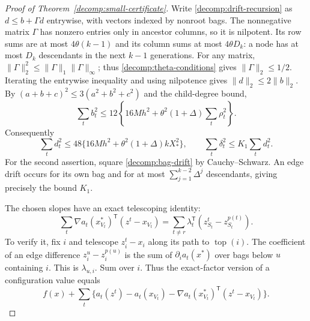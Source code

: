 \begin{proof}[Proof of Theorem~\ref{decomp:small-certificate}]
Write \eqref{decomp:drift-recursion} as $d\le b+\Gamma d$ entrywise, with
vectors indexed by nonroot bags.
The nonnegative matrix $\Gamma$ has nonzero entries only in ancestor
columns, so it is nilpotent. Its row sums are at most $4\theta(k-1)$ and its column
sums at most $4\theta D_k$: a node has at most $D_k$ descendants in the
next $k-1$ generations. For any matrix,
$\|\Gamma\|_2^2\le\|\Gamma\|_1\|\Gamma\|_\infty$; thus
\eqref{decomp:theta-conditions} gives $\|\Gamma\|_2\le1/2$.
Iterating the entrywise inequality and using nilpotence gives
$\|d\|_2\le2\|b\|_2$.
By $(a+b+c)^2\le3(a^2+b^2+c^2)$ and the child-degree bound,
\[
 \sum_tb_t^2\le12\left\{16Mh^2+
                \theta^2(1+\Delta)\sum_t\rho_t^2\right\}.
\]
Consequently
\begin{equation}\label{decomp:drift-squared}
 \sum_td_t^2\le48\{16Mh^2+
                       \theta^2(1+\Delta)kX_*^2\},
 \qquad
 \sum_t\delta_t^2\le K_1\sum_td_t^2.
\end{equation}
For the second assertion, square \eqref{decomp:bag-drift} by
Cauchy--Schwarz. An edge drift occurs for its own bag and for at most
$\sum_{j=1}^{k-2}\Delta^j$ descendants, giving precisely the bound $K_1$.

The chosen slopes have an exact telescoping identity:
\begin{equation}\label{decomp:slope-telescope}
 \sum_t\nabla a_t(x^*_{V_t})^{\mathsf T}(z^t-x_{V_t})
 =\sum_{t\ne r}\lambda_t^{\mathsf T}
                         (z^t_{S_t}-z^{p(t)}_{S_t}).
\end{equation}
To verify it, fix $i$ and telescope $z^t_i-x_i$ along its path to
$\operatorname{top}(i)$. The coefficient of an edge difference
$z^u_i-z^{p(u)}_i$ is the sum of $\partial_i a_t(x^*)$ over bags below
$u$ containing $i$. This is $\lambda_{u,i}$. Sum over $i$.
Thus the exact-factor version of a configuration value equals
\[
 f(x)+\sum_t\{a_t(z^t)-a_t(x_{V_t})-
               \nabla a_t(x^*_{V_t})^{\mathsf T}(z^t-x_{V_t})\}.
\]


\end{proof}
